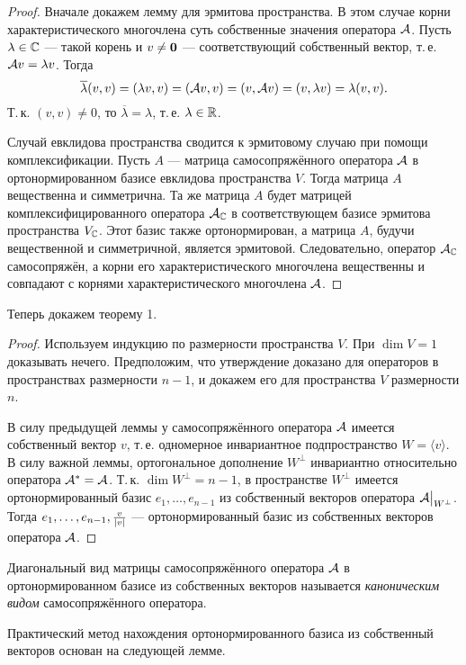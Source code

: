 \begin{proof}
    Вначале докажем лемму для эрмитова пространства. В этом случае корни характеристического многочлена суть собственные значения оператора $\mathcal{A}$. Пусть $\lambda \in \mathbb{C}$ --- такой корень и $v \ne \boldsymbol{0}$ --- соответствующий собственный вектор, т.\,е. $\mathcal{A} v = \lambda v$. Тогда
    \[
        \overline{\lambda}(v, v) = (\lambda v, v) = (\mathcal{A} v, v) = (v, \mathcal{A} v) = (v, \lambda v) = \lambda(v, v).
    \]
    Т.\,к. $(v, v) \ne 0$, то $\overline{\lambda} = \lambda$, т.\,е. $\lambda \in \mathbb{R}$.

    Случай евклидова пространства сводится к эрмитовому случаю при помощи комплексификации. Пусть $A$ --- матрица самосопряжённого оператора $\mathcal{A}$ в ортонормированном базисе евклидова пространства $V$. Тогда матрица $A$ вещественна и симметрична. Та же матрица $A$ будет матрицей комплексифицированного оператора $\mathcal{A}_{\mathbb{C}}$ в соответствующем базисе эрмитова пространства $V_{\mathbb{C}}$. Этот базис также ортонормирован, а матрица $A$, будучи вещественной и симметричной, является эрмитовой. Следовательно, оператор $\mathcal{A}_{\mathbb{C}}$ самосопряжён, а корни его характеристического многочлена вещественны и совпадают с корнями характеристического многочлена $\mathcal{A}$.
\end{proof}

Теперь докажем теорему 1.

\begin{proof}
    Используем индукцию по размерности пространства $V$. При $\dim V = 1$ доказывать нечего. Предположим, что утверждение доказано для операторов в пространствах размерности $n - 1$, и докажем его для пространства $V$ размерности $n$.

    В силу предыдущей леммы у самосопряжённого оператора $\mathcal{A}$ имеется собственный вектор $v$, т.\,е. одномерное инвариантное подпространство $W = \langle v\rangle$. В силу важной леммы, ортогональное дополнение $W^\perp$ инвариантно относительно оператора $\mathcal{A}^\ast = \mathcal{A}$. Т.\,к. $\dim W^\perp = n - 1$, в пространстве $W^\perp$ имеется ортонормированный базис $e_1, \ldots, e_{n - 1}$ из собственный векторов оператора $\mathcal{A}\big|_{W^\perp}$. Тогда $e_1, \ldots, e_{n - 1}, \frac{v}{\left\lvert v\right\rvert}$ --- ортонормированный базис из собственных векторов оператора $\mathcal{A}$.
\end{proof}

Диагональный вид матрицы самосопряжённого оператора $\mathcal{A}$ в ортонормированном базисе из собственных векторов называется \textit{каноническим видом} самосопряжённого оператора.

Практический метод нахождения ортонормированного базиса из собственный векторов основан на следующей лемме.

